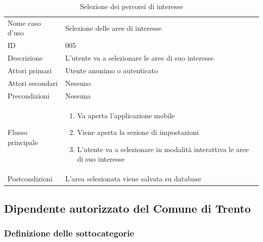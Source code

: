 \documentclass{article}
\begin{document}
\begin{table}[htbp]
    \centering
    \begin{tabularx}{\textwidth}{| l | p{} |}
        \Xhline{2pt} %
        Nome caso d'uso & Selezione delle aree di interesse \\
        \Xhline{2pt} %
        ID & 005 \\
        \hline
        Descrizione & L'utente va a selezionare le aree di suo interesse\\
        \hline
        Attori primari & Utente anonimo o autenticato\\
        \hline
        Attori secondari & Nessuno \\
        \hline
        Precondizioni & Nessuna \\
        \hline
        Flusso principale & 
        \begin{enumerate}[topsep=5pt,partopsep=0pt,parsep=0pt,itemsep=0pt,before=\vspace{-\baselineskip},after=\vspace{-\baselineskip}]                
            \item Va aperta l'applicazione mobile
            \item Viene aperta la sezione di impostazioni
            \item L'utente va a selezionare in modalità interattiva le aree di suo interesse
        \end{enumerate}
        \\
        \hline
        Postcondizioni & L'area selezionata viene salvata su database \\
        \hline
    \end{tabularx}
    \caption{Selezione dei percorsi di interesse}
    \label{tab:tabella_use_case004}
\end{table}



\subsection{Dipendente autorizzato del Comune di Trento}

\subsubsection{Definizione delle sottocategorie}
\end{document}
